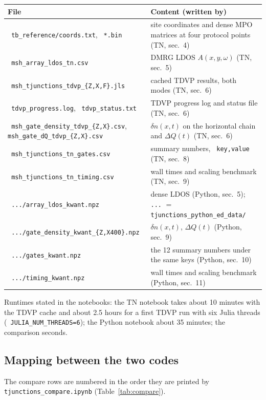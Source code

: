 \documentclass[11pt]{article}
\renewcommand{\code}[1]{\texttt{\hyphenchar\font=-1 #1}}
\begin{document}
\begin{center}
\small
\begin{tabularx}{\textwidth}{>{\raggedright}p{7.2cm}>{\raggedright\arraybackslash}X}
\toprule
File & Content (written by)\\
\midrule
\code{tb\_reference/coords.txt}, \code{*.bin} & site coordinates and dense MPO matrices at four protocol points (TN, sec.~4)\\
\code{msh\_array\_ldos\_tn.csv} & DMRG LDOS $A(x,y,\omega)$ (TN, sec.~5)\\
\code{msh\_tjunctions\_tdvp\_\{Z,X,F\}.jls} & cached TDVP results, both modes (TN, sec.~6)\\
\code{tdvp\_progress.log}, \code{tdvp\_status.txt} & TDVP progress log and status file (TN, sec.~6)\\
\code{msh\_gate\_density\_tdvp\_\{Z,X\}.csv}, \code{msh\_gate\_dQ\_tdvp\_\{Z,X\}.csv} & $\delta n(x,t)$ on the horizontal chain and $\Delta Q(t)$ (TN, sec.~6)\\
\code{msh\_tjunctions\_tn\_gates.csv} & 12 summary numbers, \code{key,value} (TN, sec.~8)\\
\code{msh\_tjunctions\_tn\_timing.csv} & wall times and scaling benchmark (TN, sec.~9)\\
\code{.../array\_ldos\_kwant.npz} & dense LDOS (Python, sec.~5); \code{...} $=$ \code{tjunctions\_python\_ed\_data/}\\
\code{.../gate\_density\_kwant\_\{Z,X400\}.npz} & $\delta n(x,t)$, $\Delta Q(t)$ (Python, sec.~9)\\
\code{.../gates\_kwant.npz} & the 12 summary numbers under the same keys (Python, sec.~10)\\
\code{.../timing\_kwant.npz} & wall times and scaling benchmark (Python, sec.~11)\\
\bottomrule
\end{tabularx}
\end{center}

Runtimes stated in the notebooks: the TN notebook takes about 10 minutes with the TDVP cache and about 2.5 hours for a first TDVP run
with six Julia threads (\code{JULIA\_NUM\_THREADS=6}); the Python notebook about 35 minutes; the comparison seconds.

\subsection{Mapping between the two codes}

The compare rows are numbered in the order they are printed by \code{tjunctions\_compare.ipynb} (Table~\ref{tab:compare}).
\end{document}
